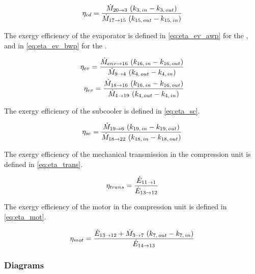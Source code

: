 \begin{equation}
  \label{eq:eta_cd}
  \eta_{cd} = \dfrac{\dotM{20}{3} \, \left( k_{3,\,in} - k_{3,\,out} \right)}{\dotM{17}{15} \, \left( k_{15,\,out} - k_{15,\,in} \right)}
  \tagaddtexttwo{$\left[-\right]$}
\end{equation}

The exergy efficiency of the evaporator is defined in
\cref{eq:eta_ev_awp} for the \AWP{}, and in \cref{eq:eta_ev_bwp} for
the \BWP{}.

\begin{subequations}
  \begin{align}
    \eta_{ev} = \dfrac{\dotM{env}{16} \, \left( k_{16,\,in} - k_{16,\,out} \right)}{\dotM{9}{4} \, \left( k_{4,\,out} - k_{4,\,in} \right)}
    \tagaddtextthree{$\left[-\right]$} \label{eq:eta_ev_awp} \\
    \eta_{ev} = \dfrac{\dotM{18}{16} \, \left( k_{16,\,in} - k_{16,\,out} \right)}{\dotM{4}{19} \, \left( k_{4,\,out} - k_{4,\,in} \right)}
    \tagaddtextthree{$\left[-\right]$} \label{eq:eta_ev_bwp}
  \end{align}
\end{subequations}

The exergy efficiency of the subcooler is defined in \cref{eq:eta_sc}.

\begin{equation}
  \label{eq:eta_sc}
  \eta_{sc} = \dfrac{\dotM{19}{6} \, \left( k_{19,\,in} - k_{19,\,out} \right)}{\dotM{18}{22} \, \left( k_{18,\,in} - k_{18,\,out} \right)}
  \tagaddtexttwo{$\left[-\right]$}
\end{equation}

The exergy efficiency of the mechanical transmission in the
compression unit is defined in \cref{eq:eta_trans}.

\begin{equation}
  \label{eq:eta_trans}
  \eta_{trans} = \dfrac{\dotE{11}{1}}{\dotE{13}{12}}
  \tagaddtexttwo{$\left[-\right]$}
\end{equation}

The exergy efficiency of the motor in the compression unit is defined
in \cref{eq:eta_mot}.

\begin{equation}
  \label{eq:eta_mot}
  \eta_{mot} = \dfrac{\dotE{13}{12} + \dotM{3}{7} \, \left( k_{7,\,out} - k_{7,\,in} \right)}{\dotE{14}{13}}
  \tagaddtexttwo{$\left[-\right]$}
\end{equation}

\subsubsection{Diagrams}
\label{sec:methodo-diagrams}

